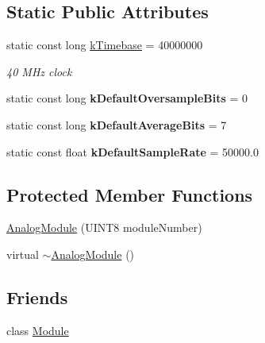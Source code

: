 \subsection*{Static Public Attributes}
\begin{DoxyCompactItemize}
\item 
\hypertarget{classAnalogModule_a93e13c1b5a181a92a660400c5c93c85c}{
static const long \hyperlink{classAnalogModule_a93e13c1b5a181a92a660400c5c93c85c}{kTimebase} = 40000000}
\label{classAnalogModule_a93e13c1b5a181a92a660400c5c93c85c}

\begin{DoxyCompactList}\small\item\em 40 MHz clock \end{DoxyCompactList}\item 
\hypertarget{classAnalogModule_a2168f18fda6489141cbac5dfcd2e8343}{
static const long {\bfseries kDefaultOversampleBits} = 0}
\label{classAnalogModule_a2168f18fda6489141cbac5dfcd2e8343}

\item 
\hypertarget{classAnalogModule_a0b4f6d9fd0b08bbdbce1c5abd799a67e}{
static const long {\bfseries kDefaultAverageBits} = 7}
\label{classAnalogModule_a0b4f6d9fd0b08bbdbce1c5abd799a67e}

\item 
\hypertarget{classAnalogModule_a0f67b2c3cd0471a85add1583ac5420e8}{
static const float {\bfseries kDefaultSampleRate} = 50000.0}
\label{classAnalogModule_a0f67b2c3cd0471a85add1583ac5420e8}

\end{DoxyCompactItemize}
\subsection*{Protected Member Functions}
\begin{DoxyCompactItemize}
\item 
\hyperlink{classAnalogModule_acd4b2c7f4760aaf15f175a70efdd9911}{AnalogModule} (UINT8 moduleNumber)
\item 
virtual \hyperlink{classAnalogModule_a480eae8e68c3e5447e423939474b607c}{$\sim$AnalogModule} ()
\end{DoxyCompactItemize}
\subsection*{Friends}
\begin{DoxyCompactItemize}
\item 
\hypertarget{classAnalogModule_a21f639900c480510650969df9c74d17d}{
class \hyperlink{classAnalogModule_a21f639900c480510650969df9c74d17d}{Module}}
\label{classAnalogModule_a21f639900c480510650969df9c74d17d}

\end{DoxyCompactItemize}



